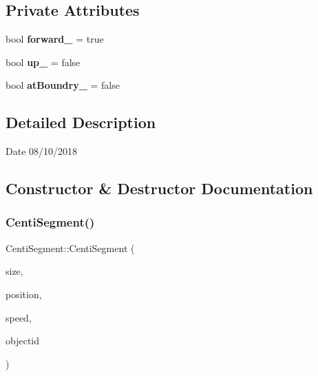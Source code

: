 \subsection*{Private Attributes}
\begin{DoxyCompactItemize}
\item 
\mbox{\label{class_centi_segment_ae586efde07494f87ea628d2e87fa1d87}} 
bool {\bfseries forward\+\_\+} = true
\item 
\mbox{\label{class_centi_segment_ae351cbdf46e19f61796cf106d0e8859e}} 
bool {\bfseries up\+\_\+} = false
\item 
\mbox{\label{class_centi_segment_a22f79151305daec489c17bcb4fa7e553}} 
bool {\bfseries at\+Boundry\+\_\+} = false
\end{DoxyCompactItemize}


\subsection{Detailed Description}
\begin{DoxyDate}{Date}
08/10/2018 
\end{DoxyDate}


\subsection{Constructor \& Destructor Documentation}
\mbox{\label{class_centi_segment_abfe286a4c657f151f8c149d88b94264c}} 
\subsubsection{\texorpdfstring{Centi\+Segment()}{CentiSegment()}}
{\footnotesize\ttfamily Centi\+Segment\+::\+Centi\+Segment (\begin{DoxyParamCaption}\item[{const \mbox{\hyperlink{classvector2_d}{vector2D}} \&}]{size,  }\item[{const \mbox{\hyperlink{classvector2_d}{vector2D}} \&}]{position,  }\item[{float}]{speed,  }\item[{Object\+ID}]{objectid }\end{DoxyParamCaption})\hspace{0.3cm}{\ttfamily [inline]}}




